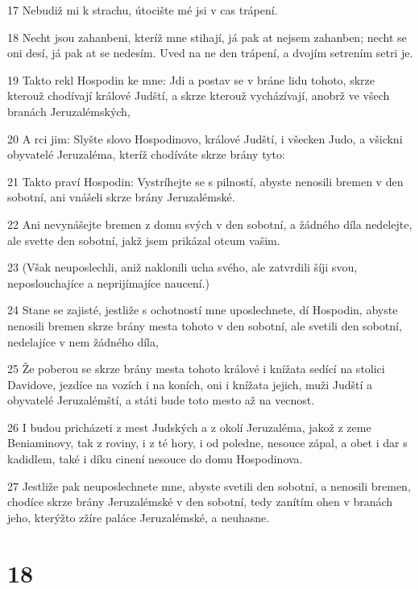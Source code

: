 \par 17 Nebudiž mi k strachu, útocište mé jsi v cas trápení.
\par 18 Necht jsou zahanbeni, kteríž mne stihají, já pak at nejsem zahanben; necht se oni desí, já pak at se nedesím. Uved na ne den trápení, a dvojím setrením setri je.
\par 19 Takto rekl Hospodin ke mne: Jdi a postav se v bráne lidu tohoto, skrze kterouž chodívají králové Judští, a skrze kterouž vycházívají, anobrž ve všech branách Jeruzalémských,
\par 20 A rci jim: Slyšte slovo Hospodinovo, králové Judští, i všecken Judo, a všickni obyvatelé Jeruzaléma, kteríž chodíváte skrze brány tyto:
\par 21 Takto praví Hospodin: Vystríhejte se s pilností, abyste nenosili bremen v den sobotní, ani vnášeli skrze brány Jeruzalémské.
\par 22 Ani nevynášejte bremen z domu svých v den sobotní, a žádného díla nedelejte, ale svette den sobotní, jakž jsem prikázal otcum vašim.
\par 23 (Však neuposlechli, aniž naklonili ucha svého, ale zatvrdili šíji svou, neposlouchajíce a neprijímajíce naucení.)
\par 24 Stane se zajisté, jestliže s ochotností mne uposlechnete, dí Hospodin, abyste nenosili bremen skrze brány mesta tohoto v den sobotní, ale svetili den sobotní, nedelajíce v nem žádného díla,
\par 25 Že poberou se skrze brány mesta tohoto králové i knížata sedící na stolici Davidove, jezdíce na vozích i na koních, oni i knížata jejich, muži Judští a obyvatelé Jeruzalémští, a státi bude toto mesto až na vecnost.
\par 26 I budou pricházeti z mest Judských a z okolí Jeruzaléma, jakož z zeme Beniaminovy, tak z roviny, i z té hory, i od poledne, nesouce zápal, a obet i dar s kadidlem, také i díku cinení nesouce do domu Hospodinova.
\par 27 Jestliže pak neuposlechnete mne, abyste svetili den sobotní, a nenosili bremen, chodíce skrze brány Jeruzalémské v den sobotní, tedy zanítím ohen v branách jeho, kterýžto zžíre paláce Jeruzalémské, a neuhasne.

\chapter{18}

